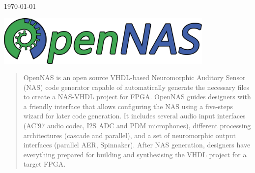 \begin{titlepage}

\vfill %
{\large \today}\\[2cm] %

\begin{center}
\includegraphics[width=0.8\textwidth]{Img_OpenNAS_extended_logo.png}\\[1cm] %
\end{center}


 

\vfill %

\end{titlepage}

\begin{abstract}
OpenNAS is an open source VHDL-based Neuromorphic Auditory Sensor (NAS) code generator capable of automatically generate the necessary files to create a NAS-VHDL project for FPGA. OpenNAS guides designers with a friendly interface that allows configuring the NAS using a five-steps wizard for later code generation. It includes several audio input interfaces (AC'97 audio codec, I2S ADC and PDM microphones), different processing architectures (cascade and parallel), and a set of neuromorphic output interfaces (parallel AER, Spinnaker). After NAS generation, designers have everything prepared for building and synthesising the VHDL project for a target FPGA. 
\end{abstract}
\newpage

